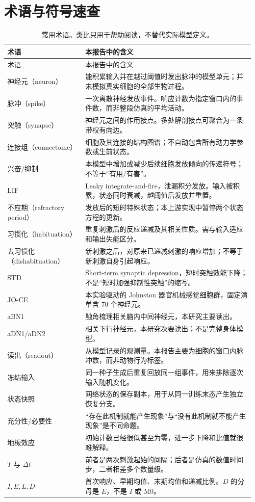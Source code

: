 \section{术语与符号速查}
\label{app:glossary}
\small
\begin{longtable}{>{\raggedright\arraybackslash}p{3.1cm}>{\raggedright\arraybackslash}p{11.8cm}}
\caption{常用术语。类比只用于帮助阅读，不替代实际模型定义。}\label{tab:glossary}\\
\toprule
术语 & 本报告中的含义\\
\midrule\endfirsthead
\toprule 术语 & 本报告中的含义\\\midrule\endhead
\bottomrule\endfoot
神经元（neuron） & 能积累输入并在越过阈值时发出脉冲的模型单元；并未模拟真实细胞的全部生物过程。\\
脉冲（spike） & 一次离散神经发放事件。响应计数为指定窗口内的事件数，而非整段仿真的平均活动。\\
突触（synapse） & 神经元之间的作用接点。多处解剖接点可聚合为一条带权有向边。\\
连接组（connectome） & 细胞及其连接的结构图谱；不自动包含所有动力学参数或生前状态。\\
兴奋/抑制 & 本模型中增加或减少后续细胞发放倾向的传递符号；不等于“有用/有害”。\\
LIF & Leaky integrate-and-fire，泄漏积分发放。输入被积累，状态同时衰减，越阈值后发放并重置。\\
不应期（refractory period） & 发放后的短时特殊状态；本上游实现中暂停两个状态方程的更新。\\
习惯化（habituation） & 重复刺激后的反应递减及其相关性质。需与输入适应和输出失能区分。\\
去习惯化（dishabituation） & 新刺激之后，对原来已递减刺激的响应增加；不等于新刺激自身引起响应。\\
STD & Short-term synaptic depression，短时突触效能下降；不是“短时加强抑制性突触”的缩写。\\
JO-CE & 本实验驱动的 Johnston 器官机械感觉细胞群，固定清单含 70 个神经元。\\
aBN1 & 触角梳理相关脑内中间神经元，本研究主要读出。\\
aDN1/aDN2 & 相关下行神经元，本研究次要读出；不是完整身体模型。\\
读出（readout） & 从模型记录的观测量。本报告主要为细胞的窗口内脉冲数，而非动物行为标签。\\
冻结输入 & 同一种子生成后重复回放同一组事件，用来排除逐次输入随机变化。\\
状态快照 & 网络状态的保存副本，用于从同一训练末态产生独立恢复分支。\\
充分性/必要性 & “存在此机制就能产生现象”与“没有此机制就不能产生现象”是不同命题。\\
地板效应 & 初始计数已经很低甚至为零，进一步下降和比值就很难解释。\\
$T$ 与 $\Delta t$ & 前者是两次刺激起始的间隔；后者是仿真的数值时间步，二者相差多个数量级。\\
$I,E,L,D$ & 首次响应、早期均值、末期均值和递减比例。$D$ 的分母是 $E$，不是 $I$ 或 M0。\\
\end{longtable}
\normalsize

